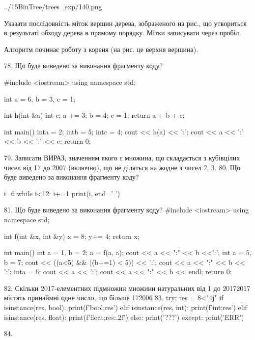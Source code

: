 \documentclass[11pt]{article}
\begin{document}
\begin{center}
	{../15BinTree/trees_exp/140.png}
\end{center}
Указати послідовність міток вершин дерева, зображеного на рис., що утвориться в результаті обходу дерева в прямому порядку. Мітки записувати через пробіл.\par Алгоритм починає роботу з кореня (на рис. це верхня вершина).

78. Що буде виведено за виконання фрагменту коду?

#include <iostream>
using namespace std;

int a = 6, b = 3, c = 1;

int h(int &a){
int c;    a += 3;
    b = 4;
    c = 1;
    return a + b + c;
}

int main(){
    inta = 2;
    intb = 5;
    intc = 4;
    cout << h(a) << ':';
    cout << a << ':' << b << ':' << c;
    return 0; 
}

79. 
Записати ВИРАЗ, значенням якого є множина, що складається з кубівцілих чисел від 17 до 2007 (включно), що не діляться на жодне з чисел 2, 3.
80. Що буде виведено за виконання фрагменту коду?

i=6
while i<12:
    i+=1
print(i, end=' ')


81. Що буде виведено за виконання фрагменту коду?
#include <iostream>
using namespace std;

int f(int &x, int &y){
    x = 8;
    y+= 4;
    return x;
}

int main(){
    int a = 1, b = 2;
    a = f(a, a);
    cout << a << ":" << b <<':';
    {
        int a = 5, b = 7;
        cout << ((a<5) && ((b+=1) < 5)) << ':';
        cout << a << ":" << b << ':';
    }
    {
        inta = 6;
        cout << a << ':';
    }
    cout << a << ":" << b << endl;
    return 0;
}


82. 
Скільки 2017-елементних підмножин множини натуральних від 1 до 20172017 містять принаймні одне число, що більше 172006
83. 
try:
    res = 8<"4j"
    if isinstance(res, bool):
        print(f'bool;{res}')
    elif isinstance(res, int):
        print(f'int;{res}')
    elif isinstance(res, float):
        print(f'float;{res:.2f}')
    else:
        print('???')
except:
    print('ERR')

84. 
\end{document}
